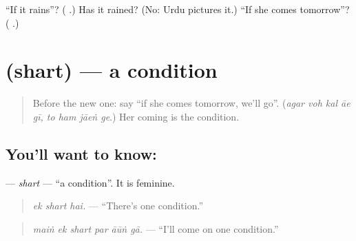 \begin{tcolorbox}[breakable,colback=teal!4,colframe=teal!35!black,title={Before you move on}]
\textquotedblleft{}If it rains\textquotedblright{}? (\textbf{  }.) Has it rained? (No: Urdu pictures it.) \textquotedblleft{}If she comes tomorrow\textquotedblright{}? (\textbf{    }.)
\end{tcolorbox}
\section[\texorpdfstring{\ur{شرط} (shart)}{شرط (shart)}]{ (shart) — a condition}

\label{lesson:UR-C274-shart}



\begin{quote}
Before the new one: say \textquotedblleft{}if she comes tomorrow, we'll go\textquotedblright{}. (\emph{agar voh kal āe gī, to ham jāeṅ ge}.) Her coming is the condition.
\end{quote}

\subsection*{You'll want to know: }
\textbf{} — \emph{shart} — \textquotedblleft{}a condition\textquotedblright{}. It is feminine.

\begin{quote}
\textbf{  }
\end{quote}

\begin{quote}
\emph{ek shart hai.} — \textquotedblleft{}There's one condition.\textquotedblright{}
\end{quote}

\begin{quote}
\textbf{     }
\end{quote}

\begin{quote}
\emph{maiṅ ek shart par āūṅ gā.} — \textquotedblleft{}I'll come on one condition.\textquotedblright{}
\end{quote}

\begin{quote}
\textbf{       }
\end{quote}

